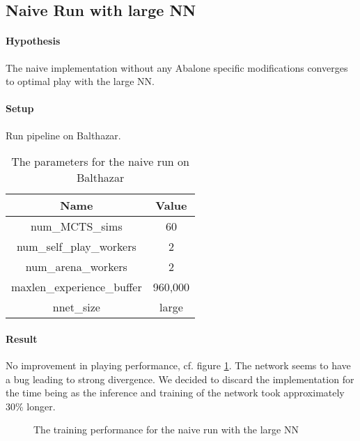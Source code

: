 \subsection{Naive Run with large NN}
\paragraph{Hypothesis} The naive implementation without any Abalone specific modifications converges to optimal play with the large NN.
\paragraph{Setup} Run pipeline on Balthazar.

\begin{table}[!h]
    \begin{center}
        \begin{tabular}{ c|c }
            Name                       & Value   \\
            \hline
            \hline
            num\_MCTS\_sims            & 60      \\
            num\_self\_play\_workers   & 2       \\
            num\_arena\_workers        & 2       \\
            maxlen\_experience\_buffer & 960,000 \\
            nnet\_size                 & large   \\
        \end{tabular}
    \end{center}
    \caption{The parameters for the naive run on Balthazar}
\end{table}

\paragraph{Result} No improvement in playing performance, cf. figure \ref{performance_local_naive_large}. The network seems to have a bug leading to strong divergence. We decided to discard the implementation for the time being as the inference and training of the network took approximately 30\% longer.
\begin{figure}[!h]
    \centering
    \hfill
    \caption{The training performance for the naive run with the large NN}
    \label{performance_local_naive_large}
\end{figure}

